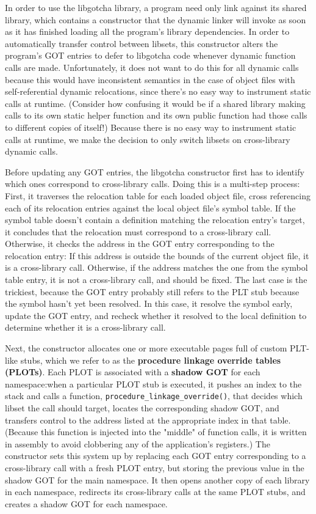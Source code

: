 In order to use the libgotcha library, a program need only link against its shared
library, which contains a constructor that the dynamic linker will invoke as soon as
it has finished loading all the program's library dependencies.  In order to
automatically transfer control between libsets, this constructor alters the program's
GOT entries to defer to libgotcha code whenever dynamic function calls are made.
Unfortunately, it does not want to do this for all dynamic calls because this would
have inconsistent semantics in the case of object files with self-referential dynamic
relocations, since there's no easy way to instrument static calls at runtime.
(Consider how confusing it would be if a shared library making calls to its own
static helper function and its own public function had those calls to different
copies of itself!)  Because there is no easy way to instrument static calls at
runtime, we make the decision to only switch libsets on cross-library dynamic calls.

Before updating any GOT entries, the libgotcha constructor first has to identify
which ones correspond to cross-library calls.  Doing this is a multi-step process:
First, it traverses the relocation table for each loaded object file, cross
referencing each of its relocation entries against the local object file's symbol
table.  If the symbol table doesn't contain a definition matching the relocation
entry's target, it concludes that the relocation must correspond to a cross-library
call.  Otherwise, it checks the address in the GOT entry corresponding to the
relocation entry:  If this address is outside the bounds of the current object file,
it is a cross-library call.  Otherwise, if the address matches the one from the
symbol table entry, it is not a cross-library call, and should be fixed.  The last
case is the trickiest, because the GOT entry probably still refers to the PLT stub
because the symbol hasn't yet been resolved.  In this case, it resolve the symbol
early, update the GOT entry, and recheck whether it resolved to the local definition
to determine whether it is a cross-library call.

Next, the constructor allocates one or more executable pages full of custom PLT-like
stubs, which we refer to as the \textbf{procedure linkage override tables (PLOTs)}.
Each PLOT is associated with a \textbf{shadow GOT} for each namespace:\@ when a
particular PLOT stub is executed, it pushes an index to the stack and calls a
function, \texttt{procedure\_linkage\_override()}, that decides which libset the call
should target, locates the corresponding shadow GOT, and transfers control to the
address listed at the appropriate index in that table.  (Because this function
is injected into the "middle" of function calls, it is written in assembly to avoid
clobbering any of the application's registers.)  The constructor sets this system up
by replacing each GOT entry corresponding to a cross-library call with a fresh PLOT
entry, but storing the previous value in the shadow GOT for the main namespace.  It
then opens another copy of each library in each namespace, redirects its
cross-library calls at the same PLOT stubs, and creates a shadow GOT for each
namespace.

